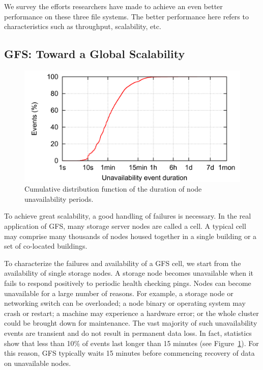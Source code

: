We survey the efforts researchers have made to achieve an even better
performance on these three file systems.
%
The better performance here refers to characteristics such as throughput,
scalability, etc.


\subsection{GFS: Toward a Global Scalability}
\label{sec:gfs_scal}
%
\begin{figure}
\centering
\includegraphics[width=0.99\columnwidth]{image/event.png}
\caption{Cumulative distribution function of the duration of node 
	unavailability periods.}
\label{fig:event}
\end{figure}
%
To achieve great scalability, a good handling of failures is necessary.
%
In the real application of GFS, many storage server nodes are called a cell.
%
A typical cell may comprise many thousands of nodes housed together in a 
single building or a set of co-located buildings.

To characterize the failures and availability of a GFS cell, we start from
the availability of single storage nodes.
%
A storage node becomes unavailable when it fails to respond positively 
to periodic health checking pings.
%
Nodes can become unavailable for a large number of
reasons. For example, a storage node or networking switch can be overloaded; 
a node binary or operating system may crash or restart; 
a machine may experience a hardware error; 
or the whole cluster could be brought down for maintenance. 
%
The vast majority of such unavailability events are transient and do not 
result in permanent data loss.
%
In fact, statistics show that less than 10\% of events last longer than 15 
minutes (see Figure~\ref{fig:event}).
%
For this reason, GFS typically waits 15 minutes before commencing 
recovery of data on unavailable nodes.

